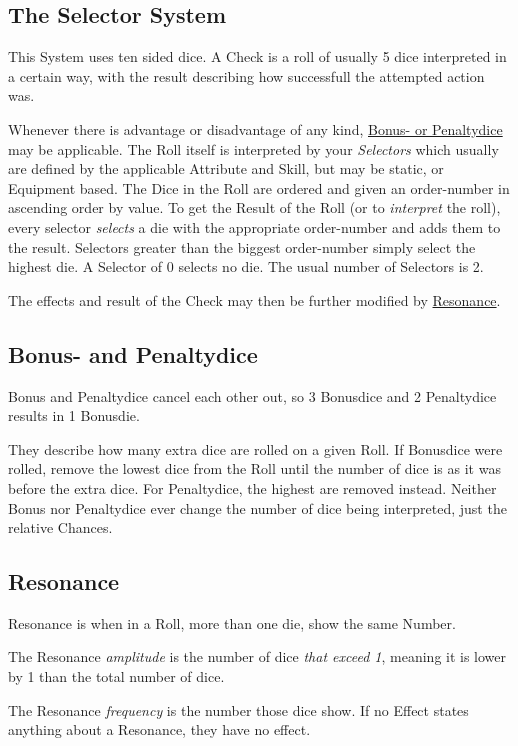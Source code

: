     \subsection{The Selector System}\label{subsec:selectorsystem}
    This System uses  ten sided dice.
    A Check is a roll of usually 5 dice interpreted in a certain way,
    with the result describing how successfull the attempted action was.\par
    Whenever there is advantage or disadvantage of any kind,
    \hyperref[subsec:bonus--and-penaltydice]{Bonus- or Penaltydice} may be applicable.
    The Roll itself is interpreted by your \emph{Selectors} which usually are defined
    by the applicable Attribute and Skill, but may be static, or Equipment based.
    The Dice in the Roll are ordered and given an order-number in ascending order by value.
    To get the Result of the Roll (or to \emph{interpret} the roll), every selector \emph{selects} a die with the
    appropriate order-number and adds them to the result.
    Selectors greater than the biggest order-number simply select the highest die.
    A Selector of 0 selects no die.
    The usual number of Selectors is 2.\par
    The effects and result of the Check may then be further modified by \hyperref[subsec:resonance]{Resonance}.
    \vspace{1cm}

    \subsection{Bonus- and Penaltydice}\label{subsec:bonus--and-penaltydice}
    Bonus and Penaltydice cancel each other out, so 3 Bonusdice and 2 Penaltydice results in 1 Bonusdie.\par
    They describe how many extra dice are rolled on a given Roll.
    If Bonusdice were rolled,
    remove the lowest dice from the Roll until the number of dice is as it was before the extra dice.
    For Penaltydice, the highest are removed instead.
    Neither Bonus nor Penaltydice ever change the number of dice being interpreted, just the relative Chances.

    \subsection{Resonance}\label{subsec:resonance}
    Resonance is when in a Roll, more than one die, show the same Number.\par
    The Resonance \emph{amplitude} is the number of dice \emph{that exceed 1}, meaning it is lower by 1 than the total
    number of dice.\par
    The Resonance \emph{frequency} is the number those dice show.
    If no Effect states anything about a Resonance, they have no effect.

